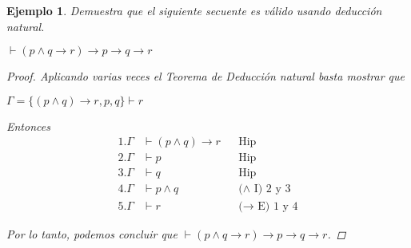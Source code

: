 \documentclass[letterpaper,12pt]{article}
\newtheorem{ejem}{Ejemplo}[]
\begin{document}
    \begin{ejem}
        Demuestra que el siguiente secuente es válido usando deducción 
        natural.
        \begin{center}
            $\vdash (p \land q \rightarrow r) \rightarrow p \rightarrow q
            \rightarrow r$
        \end{center}

        \begin{proof}
            Aplicando varias veces el Teorema de Deducción natural basta
            mostrar que 
            \begin{center}
                $\Gamma = \{(p \land q) \rightarrow r, p, q \} \vdash r$
            \end{center}

            \justify
            Entonces 
            \begin{align*}
                1. \Gamma &\vdash (p \land q) \rightarrow r
                && \text{Hip} \\
                2. \Gamma &\vdash p
                && \text{Hip} \\
                3. \Gamma &\vdash q 
                && \text{Hip} \\
                4. \Gamma &\vdash p \land q
                && \text{($\land$ I) 2 y 3} \\
                5. \Gamma &\vdash r
                && \text{($\rightarrow$ E) 1 y 4}
            \end{align*}
            
            \justify
            Por lo tanto, podemos concluir que
            $\vdash (p \land q \rightarrow r) \rightarrow p 
            \rightarrow q \rightarrow r$.
            
        \end{proof}
    \end{ejem}
\end{document}
